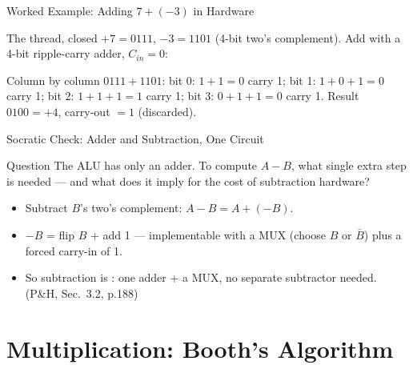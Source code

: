 \documentclass[aspectratio=169]{beamer}
\begin{document}
\begin{frame}{Worked Example: Adding $7 + (-3)$ in Hardware}
  \begin{block}{The thread, closed}
    $+7 = 0111$, $-3 = 1101$ (4-bit two's complement). Add with a 4-bit
    ripple-carry adder, $C_{in}=0$:
  \end{block}
  \begin{exampleblock}{Column by column}
    $0111 + 1101$: bit 0: $1+1=0$ carry 1; bit 1: $1+0+1=0$ carry 1;
    bit 2: $1+1+1=1$ carry 1; bit 3: $0+1+1=0$ carry 1.
    Result $0100 = +4$, carry-out $=1$ (discarded).
  \end{exampleblock}
  \vspace{0.2cm}
\end{frame}

\begin{frame}{Socratic Check: Adder and Subtraction, One Circuit}
  \begin{alertblock}{Question}
    The ALU has only an adder. To compute $A - B$, what single extra step is
    needed --- and what does it imply for the cost of subtraction hardware?
  \end{alertblock}
  \begin{itemize}
    \item Subtract $B$'s two's complement: $A - B = A + (-B)$.
    \item $-B$ = flip $B$ + add 1 --- implementable with a MUX (choose $B$ or
      $\bar B$) plus a forced carry-in of 1.
    \item So subtraction is : one adder + a MUX, no separate
      subtractor needed. (P\&H, Sec.~3.2, p.188)
      \cite{PattersonHennessy2017_computer_organization_design}
  \end{itemize}
\end{frame}


\section{Multiplication: Booth's Algorithm}
\end{document}
